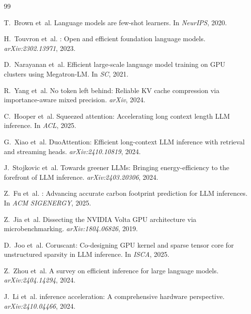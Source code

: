 \documentclass[sigconf,10pt]{acmart}
\begin{document}
\begin{thebibliography}{99}

T.~Brown et~al.
\newblock Language models are few-shot learners.
\newblock In \emph{NeurIPS}, 2020.

H.~Touvron et~al.
: Open and efficient foundation language models.
\newblock \emph{arXiv:2302.13971}, 2023.

D.~Narayanan et~al.
\newblock Efficient large-scale language model training on {GPU} clusters
  using {Megatron-LM}.
\newblock In \emph{SC}, 2021.


R.~Yang et~al.
\newblock No token left behind: Reliable {KV} cache compression via
  importance-aware mixed precision.
\newblock \emph{arXiv}, 2024.

C.~Hooper et~al.
\newblock Squeezed attention: Accelerating long context length {LLM} inference.
\newblock In \emph{ACL}, 2025.

G.~Xiao et~al.
\newblock DuoAttention: Efficient long-context {LLM} inference with retrieval
  and streaming heads.
\newblock \emph{arXiv:2410.10819}, 2024.


J.~Stojkovic et~al.
\newblock Towards greener {LLMs}: Bringing energy-efficiency to the forefront
  of {LLM} inference.
\newblock \emph{arXiv:2403.20306}, 2024.

Z.~Fu et~al.
: Advancing accurate carbon footprint prediction for {LLM}
  inferences.
\newblock In \emph{ACM SIGENERGY}, 2025.


Z.~Jia et~al.
\newblock Dissecting the {NVIDIA} {Volta} {GPU} architecture via
  microbenchmarking.
\newblock \emph{arXiv:1804.06826}, 2019.


D.~Joo et~al.
\newblock Coruscant: Co-designing {GPU} kernel and sparse tensor core for
  unstructured sparsity in {LLM} inference.
\newblock In \emph{ISCA}, 2025.


Z.~Zhou et~al.
\newblock A survey on efficient inference for large language models.
\newblock \emph{arXiv:2404.14294}, 2024.

J.~Li et~al.
 inference acceleration: A comprehensive hardware perspective.
\newblock \emph{arXiv:2410.04466}, 2024.

\end{thebibliography}
\end{document}
